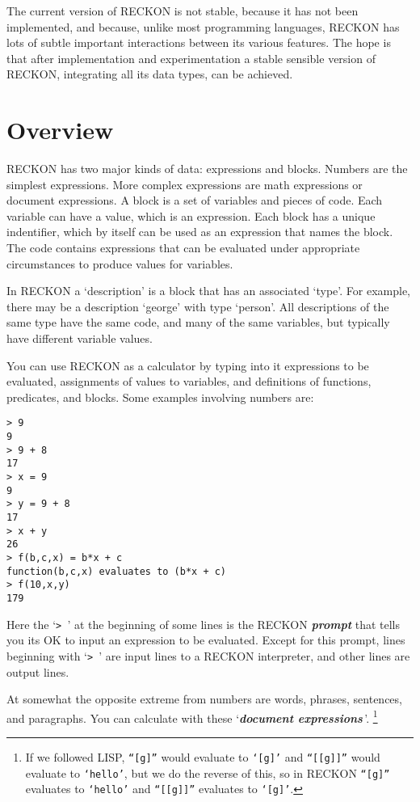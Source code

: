 \documentclass[12pt]{article}
\newcommand{\key}[1]{{\bf \em #1}\index{#1}}
\newcommand{\skey}[2]{{\bf \em #1#2}\index{#1}}
\newenvironment{indpar}[1][0.3in]%
	{\begin{list}{}%
		     {\setlength{\itemsep}{0in}%
		      \setlength{\topsep}{0in}%
		      \setlength{\parsep}{1ex}%
		      \setlength{\labelwidth}{#1}%
		      \setlength{\leftmargin}{#1}%
		      \addtolength{\leftmargin}{\labelsep}}%
	 \item}%
	{\end{list}}
\begin{document}
The current version of RECKON is not stable, because it has not been
implemented, and because, unlike most programming languages, RECKON
has lots of subtle important interactions between its various features.  The
hope is that after implementation and experimentation a stable sensible
version of RECKON, integrating all its data types, can be achieved.

\section{Overview}

RECKON has two major kinds of data: expressions and blocks.  Numbers are
the simplest expressions.  More complex expressions are math
expressions or document expressions.  A block is a set of variables
and pieces of code.  Each variable can have a value, which is an expression.
Each block has a unique indentifier, which by itself can be used as
an expression that names the block.
The code contains expressions that can be evaluated under appropriate
circumstances to produce values for variables.

In RECKON a `description' is a block that has an associated `type'.  For
example, there may be a description `george' with type `person'.  All
descriptions of the same type have the same code,
and many of the same variables,
but typically have different variable values.

You can use RECKON as a calculator by typing into it expressions to
be evaluated, assignments of values to variables, and definitions
of functions, predicates, and blocks.  Some examples involving numbers are:

\begin{indpar}\begin{verbatim}
> 9
9
> 9 + 8
17
> x = 9
9
> y = 9 + 8
17
> x + y
26
> f(b,c,x) = b*x + c
function(b,c,x) evaluates to (b*x + c)
> f(10,x,y)
179
\end{verbatim}\end{indpar}

Here the `\verb|> |' at the beginning of some lines is the RECKON \key{prompt}
that tells you its OK to input an expression to be evaluated.
Except for this prompt, lines beginning with `\verb|> |' are input lines to
a RECKON interpreter, and other lines are output lines.

At somewhat the opposite extreme from numbers are words, phrases, sentences,
and paragraphs.  You can calculate with these `\skey{document expression}s\,'.%
\footnote{If we followed LISP, {\tt ``[g]''} would evaluate to {\tt `[g]'}
and {\tt ``[[g]]''} would evaluate to {\tt `hello'}, but we do the
reverse of this, so in RECKON {\tt ``[g]''} evaluates to {\tt `hello'}
and {\tt ``[[g]]''} evaluates to {\tt `[g]'}.}
\end{document}
